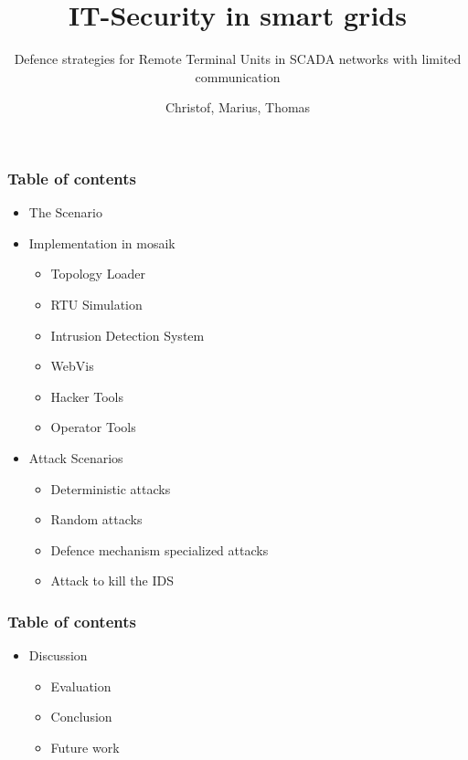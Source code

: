 \documentclass{beamer}
\author{Christof, Marius, Thomas}
\title{IT-Security in smart grids}
\subtitle{Defence strategies for Remote Terminal Units in SCADA networks with limited communication}
\begin{document}
%



\begin{frame}[plain]
	\maketitle
\end{frame}

\begin{frame}
	\frametitle{Table of contents}
	\begin{itemize}
		\item The Scenario
		\pause
		\item Implementation in mosaik
			\begin{itemize}
				\item Topology Loader
				\item RTU Simulation
				\item Intrusion Detection System
				\item WebVis
				\item Hacker Tools
				\item Operator Tools
			\end{itemize}
		\pause
		\item Attack Scenarios
			\begin{itemize}
				\item Deterministic attacks
				\item Random attacks
				\item Defence mechanism specialized attacks
				\item Attack to kill the IDS
			\end{itemize}
	\end{itemize}
\end{frame}

\begin{frame}
	\frametitle{Table of contents}
	\begin{itemize}
		\item Discussion
			\begin{itemize}
				\item Evaluation
				\item Conclusion
				\item Future work
			\end{itemize}
	\end{itemize}
\end{frame}
\end{document}
